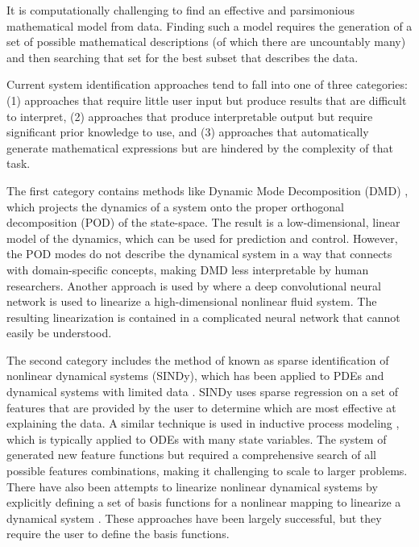 \documentclass{article}
\begin{document}
It is computationally challenging to find an effective and parsimonious mathematical model from data. Finding such a model requires the generation of a set of possible mathematical descriptions (of which there are uncountably many) and then searching that set for the best subset that describes the data.
 
Current system identification approaches tend to fall into one of three categories: (1) approaches that require little user input but produce results that are difficult to interpret, (2) approaches that produce interpretable output but require significant prior knowledge to use, and (3) approaches that automatically generate mathematical expressions but are hindered by the complexity of that task.

The first category contains methods like Dynamic Mode Decomposition (DMD) \cite{schmid2010dynamic, kutz2016dynamic}, which projects the dynamics of a system onto the proper orthogonal decomposition (POD) of the state-space. The result is a low-dimensional, linear model of the dynamics, which can be used for prediction and control. However, the POD modes do not describe the dynamical system in a way that connects with domain-specific concepts, making DMD less interpretable by human researchers. Another approach is used by \citet{morton2018deep} where a deep convolutional neural network is used to linearize a high-dimensional nonlinear fluid system. The resulting linearization is contained in a complicated neural network that cannot easily be understood.

The second category includes the method of \citet{brunton2016discovering} known as sparse identification of nonlinear dynamical systems (SINDy), which has been applied to PDEs \cite{rudy2017data} and dynamical systems with limited data \cite{kaiser2018sparse}. SINDy uses sparse regression on a set of features that are provided by the user to determine which are most effective at explaining the data. A similar technique is used in inductive process modeling \cite{bridewell2008inductive, langley2015heuristic}, which is typically applied to ODEs with many state variables. The system of  generated new feature functions but required a comprehensive search of all possible features combinations, making it challenging to scale to larger problems. There have also been attempts to linearize nonlinear dynamical systems by explicitly defining a set of basis functions for a nonlinear mapping to linearize a dynamical system \cite{williams2015data, johnson2018class}. These approaches have been largely successful, but they require the user to define the basis functions. 
\end{document}
